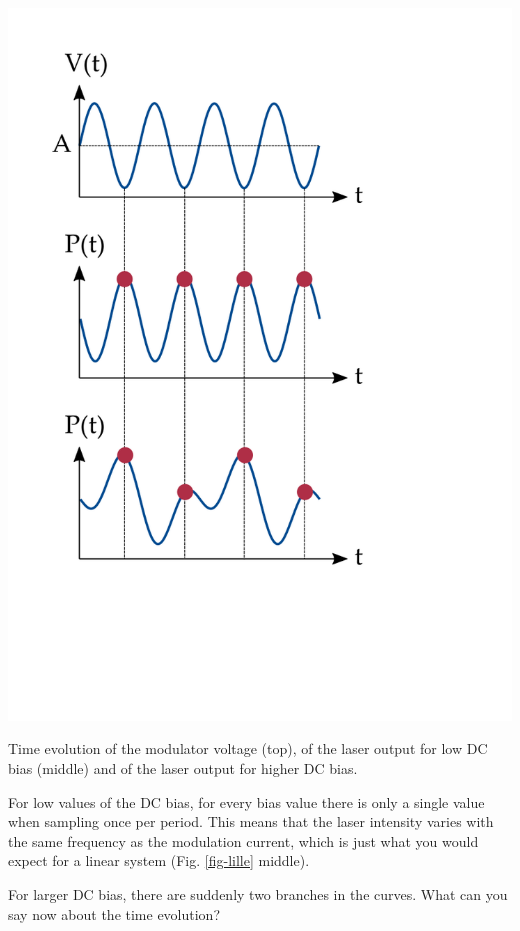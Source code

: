 \begin{marginfigure}
\centering
\includegraphics{dynamic/figures/lille}
\caption{Time evolution of the modulator voltage (top), of the laser output for low DC bias (middle) and of the laser output for higher DC bias.}
\label{fig-lille}
\end{marginfigure}

For low values of the DC bias, for every bias value there is only a single value when sampling once per period. This means that the laser intensity varies with the same frequency as the modulation current, which is just what you would expect for a linear system (Fig. \ref{fig-lille} middle).

\begin{cue}
For larger DC bias, there are suddenly two branches in the curves. What can you say now about the time evolution?
\end{cue}

